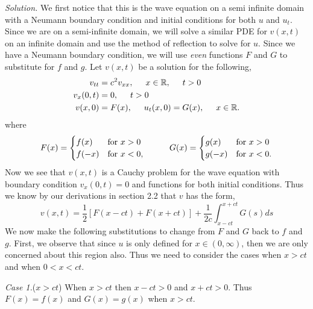\documentclass{article}
\begin{document}
\vspace{3mm}
\textit{Solution.} We first notice that this is the wave equation on a semi infinite domain with a Neumann boundary condition and initial conditions for both \(u\) and \(u_t\). Since we are on a semi-infinite domain, we will solve a similar PDE for \(v(x,t)\) on an infinite domain and use the method of reflection to solve for \(u\). Since we have a Neumann boundary condition, we will use \textit{even} functions \(F\) and \(G\) to substitute for \(f\) and \(g\). Let \(v(x,t)\) be a solution for the following,
\begin{align}
v_{tt} &= c^2 v_{xx}, \hspace{5mm} x\in\mathbb{R}, \hspace{5mm} t>0\\
v_x(0,t)&= 0, \hspace{5mm}t>0 \\
v(x,0) &= F(x), \hspace{5mm} u_t(x,0)=G (x), \hspace{5mm} x\in\mathbb{R}.
\end{align}
where
\[
  F(x) =
  \begin{cases}
                                   f(x) & \text{for } x>0 \\
                                   f(-x) & \text{for } x<0,
  \end{cases} 
  \hspace{10mm}
    G(x) =
  \begin{cases}
                                   g(x) & \text{for } x>0 \\
                                   g(-x) & \text{for } x<0.
  \end{cases}
\]
Now we see that \(v(x,t)\) is a Cauchy problem for the wave equation with boundary condition \(v_x(0,t)=0\) and functions for both initial conditions. Thus we know by our derivations in section 2.2 that \(v\) has the form, 
\[
v(x,t) = \frac{1}{2}[F(x-ct)+F(x+ct)] + \frac{1}{2c} \int_{x-ct}^{x+ct} G(s) ds 
\]
We now make the following substitutions to change from \(F\) and \(G\) back to \(f\) and \(g\). First, we observe that since \(u\) is only defined for \(x\in (0,\infty)\), then we are only concerned about this region also. Thus we need to consider the cases when \(x>ct\) and when \(0<x<ct\).

\vspace{2mm} 
\textit{Case 1.}(\(x>ct\)) When \(x>ct\) then \(x-ct>0\) and \( x+ct>0\). Thus \(F(x)=f(x) \) and \(G(x) = g(x)\) when \(x>ct\). 
\end{document}

